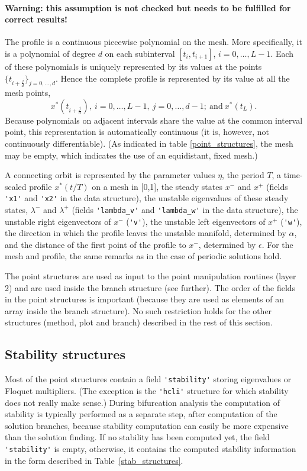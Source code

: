 \documentclass[10pt]{scrartcl}
\newcommand{\blist}[1]{\mbox{\lstinline!#1!}}
\begin{document}
\paragraph{Warning:
this assumption is not checked but needs to be fulfilled for
correct results!}
The profile is a continuous piecewise polynomial on the mesh. 
More specifically, it is
a polynomial of degree $d$ on each
subinterval $[t_i,t_{i+1}]$, $i=0,\ldots,L-1$.
Each of these polynomials is uniquely represented
by its values at the points $\{t_{i+\frac{j}{d}}\}_{j=0,\ldots,d}$.
Hence the complete profile is represented by
its value at all the mesh points,
\[
x^*(t_{i+\frac{j}{d}}),\ i=0,\ldots,L-1,\ j=0,\ldots,d-1;
\mathrm{\ and\ } x^*(t_L).
\]
Because polynomials on adjacent intervals share the value
at the common interval point, this representation is automatically
continuous (it is, however, not continuously differentiable).
(As indicated in table \ref{point_structures}, the mesh may be empty, 
which indicates the use of an equidistant, fixed mesh.)

A connecting orbit is represented by the parameter values $\eta$, the
period $T$, a time-scaled profile $x^*(t/T)$ on a mesh in [0,1], the
steady states $x^-$ and $x^+$ (fields \blist{'x1'} and \blist{'x2'} in
the data structure), the unstable eigenvalues of these steady states,
$\lambda^-$ and $\lambda^+$ (fields \blist{'lambda_v'} and
\blist{'lambda_w'} in the data structure), the unstable right
eigenvectors of $x^-$ (\blist{'v'}), the unstable left eigenvectors of
$x^+$ (\blist{'w'}), the direction in which the profile leaves the unstable
manifold, determined by $\alpha$, and the distance of the first point
of the profile to $x^-$, determined by $\epsilon$.  For the mesh and
profile, the same remarks as in the case of periodic solutions hold.

The point structures are used as input to the point
manipulation routines (layer 2) and are used inside
the branch structure (see further). The order of the fields in the point 
structures is important (because they are used as elements
of an array inside the branch structure).
No such restriction holds for the other structures (method, plot and
branch) described in the rest of this section.

\subsection{Stability structures}\label{sec:stab:struct}

Most of the point structures contain a 
field \blist{'stability'} storing eigenvalues or Floquet multipliers. (The exception is  
the \blist{'hcli'} structure for which stability does not really make
sense.) During bifurcation analysis the computation of stability is
typically performed as a separate step, after computation of the
solution branches, because stability computation can easily be more
expensive than the solution finding. If no stability has been computed
yet, the field \blist{'stability'} is empty, otherwise, it contains
the computed stability information in the form described in
Table~\ref{stab_structures}.
\end{document}

